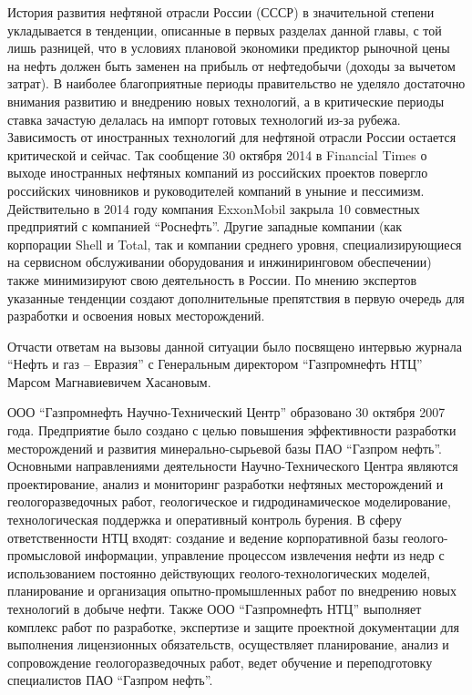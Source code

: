 История развития нефтяной отрасли России (СССР) в значительной степени укладывается в тенденции, описанные в первых разделах данной главы, с той лишь разницей, что в условиях плановой экономики предиктор рыночной цены на нефть должен быть заменен на прибыль от нефтедобычи (доходы за вычетом затрат).
В наиболее благоприятные периоды правительство не уделяло достаточно внимания развитию и внедрению новых технологий, а в критические периоды ставка зачастую делалась на импорт готовых технологий из-за рубежа.
Зависимость от иностранных технологий для нефтяной отрасли России остается критической и сейчас.
Так сообщение 30 октября 2014 в Financial Times о выходе иностранных нефтяных компаний из российских проектов повергло российских чиновников и руководителей компаний в уныние и пессимизм.
Действительно в 2014 году компания ExxonMobil закрыла 10 совместных предприятий с компанией ``Роснефть''.
Другие западные компании (как корпорации Shell и Total, так и компании среднего уровня, специализирующиеся на сервисном обслуживании оборудования и инжиниринговом обеспечении) также минимизируют свою деятельность в России.
По мнению экспертов указанные тенденции создают дополнительные препятствия в первую очередь для разработки и освоения новых месторождений.

Отчасти ответам на вызовы данной ситуации было посвящено интервью журнала ``Нефть и газ -- Евразия'' с Генеральным директором ``Газпромнефть НТЦ'' Марсом Магнавиевичем Хасановым.

ООО ``Газпромнефть Научно-Технический Центр'' образовано 30 октября 2007 года.
Предприятие было создано с целью повышения эффективности разработки месторождений и развития минерально-сырьевой базы ПАО ``Газпром нефть''.
Основными направлениями деятельности Научно-Технического Центра являются проектирование, анализ и мониторинг разработки нефтяных месторождений и геологоразведочных работ, геологическое и гидродинамическое моделирование, технологическая поддержка и оперативный контроль бурения.
В сферу ответственности НТЦ входят: создание и ведение корпоративной базы геолого-промысловой информации, управление процессом извлечения нефти из недр с использованием постоянно действующих геолого-технологических моделей, планирование и организация опытно-промышленных работ по внедрению новых технологий в добыче нефти.
Также ООО ``Газпромнефть НТЦ'' выполняет комплекс работ по разработке, экспертизе и защите проектной документации для выполнения лицензионных обязательств, осуществляет планирование, анализ и сопровождение геологоразведочных работ, ведет обучение и переподготовку специалистов ПАО ``Газпром нефть''.

